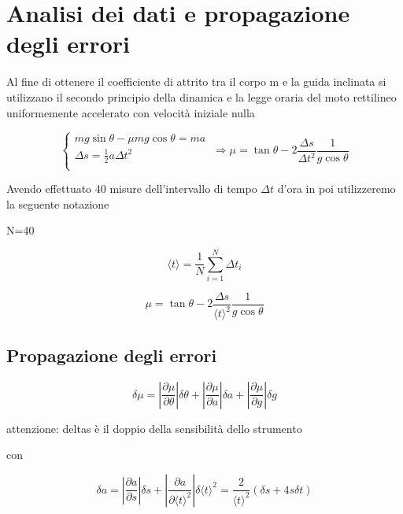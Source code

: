 \documentclass[11pt,a4paper]{article}
\begin{document}
\section{Analisi dei dati e propagazione degli errori}
Al fine di ottenere il coefficiente di attrito tra il corpo m e la guida inclinata si utilizzano il secondo principio della dinamica e la legge oraria del moto rettilineo uniformemente accelerato con velocità iniziale nulla

\begin{equation}
    \begin{cases}
      mg \sin \theta - \mu mg \cos \theta = ma\\
      \Delta s=\frac{1}{2}a \Delta t^2 \\
    \end{cases}\
    \Longrightarrow
    \mu = \tan \theta - 2\frac{\Delta s}{\Delta t^2}\frac{1}{g \cos \theta}
\end{equation}



Avendo effettuato 40 misure dell'intervallo di tempo $\Delta t$ d'ora in poi utilizzeremo la seguente notazione

N=40

\begin{equation}
    \langle t \rangle = \frac{1}{N} \sum_{i=1}^N \Delta t_i
\end{equation}
    
\begin{equation}
    \mu = \tan \theta - 2\frac{\Delta s}{\langle t \rangle^2}\frac{1}{g \cos \theta}
\end{equation}

\subsection{Propagazione degli errori}
\begin{equation}
    \delta \mu = \left | \frac{\partial \mu}{\partial \theta} \right | \delta \theta + \left | \frac{\partial \mu}{\partial a} \right | \delta a + \left | \frac{\partial \mu}{\partial g} \right | \delta g
\end{equation}

attenzione: deltas è il doppio della sensibilità dello strumento

con 

\begin{equation}
    \delta a= \left | \frac{\partial a}{\partial s} \right | \delta s + \left | \frac{\partial a}{\partial \langle t \rangle ^2} \right | \delta \langle t \rangle ^2 = \frac{2}{\langle t \rangle ^2} (\delta s + 4s\delta t)
\end{equation}
\end{document}
